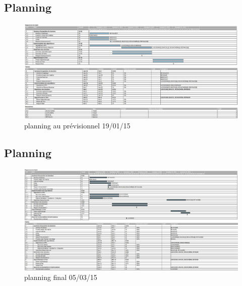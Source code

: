 \documentclass[10pt,a4paper]{report}
\begin{document}
\begin{landscape}
\subsection*{Planning}

\begin{figure}[!h]
	\center
		\includegraphics[scale=0.5]{./Ressource/planning_previsionnel.png}
 	\caption{planning au prévisionnel 19/01/15}
\end{figure}
\newpage
\subsection*{Planning}
\begin{figure}[!h]
	\center
		\includegraphics[scale=0.5]{./Ressource/planning_final.png}
 	\caption{planning final 05/03/15}
\end{figure}
\end{landscape}
\end{document}
